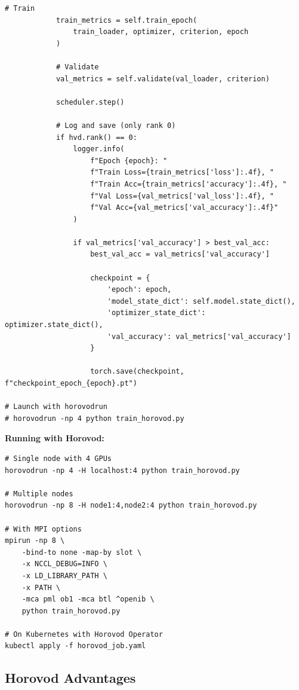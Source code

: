 \begin{lstlisting}[style=python, caption=Distributed Training with Horovod]
            # Train
            train_metrics = self.train_epoch(
                train_loader, optimizer, criterion, epoch
            )

            # Validate
            val_metrics = self.validate(val_loader, criterion)

            scheduler.step()

            # Log and save (only rank 0)
            if hvd.rank() == 0:
                logger.info(
                    f"Epoch {epoch}: "
                    f"Train Loss={train_metrics['loss']:.4f}, "
                    f"Train Acc={train_metrics['accuracy']:.4f}, "
                    f"Val Loss={val_metrics['val_loss']:.4f}, "
                    f"Val Acc={val_metrics['val_accuracy']:.4f}"
                )

                if val_metrics['val_accuracy'] > best_val_acc:
                    best_val_acc = val_metrics['val_accuracy']

                    checkpoint = {
                        'epoch': epoch,
                        'model_state_dict': self.model.state_dict(),
                        'optimizer_state_dict': optimizer.state_dict(),
                        'val_accuracy': val_metrics['val_accuracy']
                    }

                    torch.save(checkpoint, f"checkpoint_epoch_{epoch}.pt")

# Launch with horovodrun
# horovodrun -np 4 python train_horovod.py
\end{lstlisting}

\textbf{Running with Horovod:}

\begin{lstlisting}[style=bash, caption=Launch Horovod Training]
# Single node with 4 GPUs
horovodrun -np 4 -H localhost:4 python train_horovod.py

# Multiple nodes
horovodrun -np 8 -H node1:4,node2:4 python train_horovod.py

# With MPI options
mpirun -np 8 \
    -bind-to none -map-by slot \
    -x NCCL_DEBUG=INFO \
    -x LD_LIBRARY_PATH \
    -x PATH \
    -mca pml ob1 -mca btl ^openib \
    python train_horovod.py

# On Kubernetes with Horovod Operator
kubectl apply -f horovod_job.yaml
\end{lstlisting}

\subsection{Horovod Advantages}

